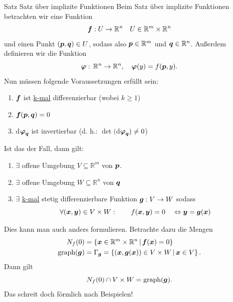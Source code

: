 \begin{Satz}{Satz}
    {Satz über implizite Funktionen}
    Beim Satz über implizite Funktionen betrachten wir eine Funktion
    \begin{equation*}
        {{\text{\boldmath${f}$}}}:U\rightarrow\mathbb{R}^n \quad U\in\mathbb{R}^m\times\mathbb{R}^n
    \end{equation*}
    und einen Punkt $({{\text{\boldmath${p}$}}},{{\text{\boldmath${q}$}}})\in U$, sodass also ${{\text{\boldmath${p}$}}}\in\mathbb{R}^m$ und ${{\text{\boldmath${q}$}}}\in\mathbb{R}^n$. Außerdem definieren wir die Funktion
    \begin{equation*}
        {{\text{\boldmath${\varphi}$}}}:\,\mathbb{R}^n\rightarrow\mathbb{R}^n, \quad {{\text{\boldmath${\varphi}$}}}(y) = f({{\text{\boldmath${p}$}}},y).
    \end{equation*}
    Nun müssen folgende Voraussetzungen erfüllt sein:
    \begin{enumerate}
        \item ${{\text{\boldmath${f}$}}}$ ist \underline{k-mal} differenzierbar (wobei $k\geq 1$)
        \item ${{\text{\boldmath${f}$}}}({{\text{\boldmath${p}$}}},{{\text{\boldmath${q}$}}})=0$
        \item d${{\text{\boldmath${\varphi}$}}}_{{\text{\boldmath${q}$}}}$ ist invertierbar (d. h.: $\det ($d${{\text{\boldmath${\varphi}$}}}_{{\text{\boldmath${q}$}}})\neq 0$)
    \end{enumerate}
    Ist das der Fall, dann gilt:
    \begin{enumerate}
        \item $\exists$ offene Umgebung $V\subseteq\mathbb{R}^m$ von ${{\text{\boldmath${p}$}}}$.
        \item $\exists$ offene Umgebung $W\subseteq\mathbb{R}^n$ von ${{\text{\boldmath${q}$}}}$
        \item $\exists$ \underline{k-mal} stetig differenzierbare Funktion ${{\text{\boldmath${g}$}}}:V\rightarrow W$ sodass
        \begin{equation*}
            \forall({{\text{\boldmath${x}$}}},{{\text{\boldmath${y}$}}})\in V\times W: \qquad f({{\text{\boldmath${x}$}}},{{\text{\boldmath${y}$}}}) = 0 \quad \Leftrightarrow {{\text{\boldmath${y}$}}} = {{\text{\boldmath${g}$}}}({{\text{\boldmath${x}$}}}) 
        \end{equation*}
    \end{enumerate}
    Dies kann man auch anders formulieren. Betrachte dazu die Mengen
    \begin{align*}
        N_f(0)&=\left\{{{\text{\boldmath${x}$}}}\in\mathbb{R}^m\times\mathbb{R}^n\,|\,{{\text{\boldmath${f}$}}}({{\text{\boldmath${x}$}}})=0\right\} \\
        \text{graph}({{\text{\boldmath${g}$}}})&=\Gamma_{{\text{\boldmath${g}$}}}=\left\{({{\text{\boldmath${x}$}}},{{\text{\boldmath${g}$}}}({{\text{\boldmath${x}$}}}))\in V\times W\,|\,{{\text{\boldmath${x}$}}}\in V\right\}.
    \end{align*}
    Dann gilt
    \begin{equation*}
        N_f(0)\cap V\times W = \text{graph}({{\text{\boldmath${g}$}}}).
    \end{equation*}
    Das schreit doch förmlich nach Beispielen!
\end{Satz}


